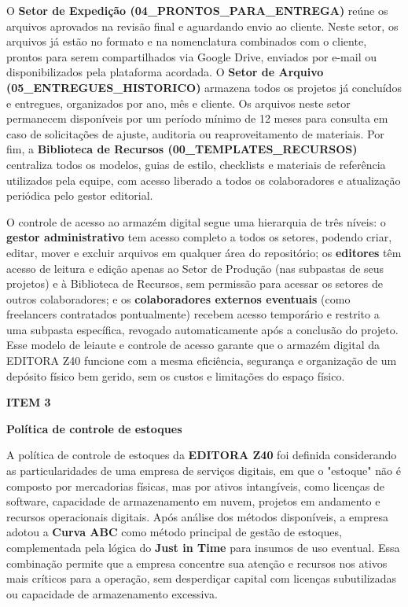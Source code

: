 \documentclass[10pt,a4paper]{article}
\newcommand{\labelfont}{\fontsize{5.8}{7.5}\selectfont\bfseries\addfontfeatures{LetterSpace=15}}
\newcommand{\headingfont}{\fontsize{9.8}{12}\selectfont\bfseries\color{navy}}
\newcommand{\separador}{\vspace{16pt}{\color{rulegray}\rule{\linewidth}{0.6pt}}\vspace{10pt}}
\newcommand{\itemh}[2]{\needspace{6\baselineskip}%
  {\labelfont\color{graylab}ITEM #1}\par\vspace{5pt}%
  {\headingfont #2}\par\vspace{8pt}}
\begin{document}
O \textbf{Setor de Expedição (04\_PRONTOS\_PARA\_ENTREGA)} reúne os arquivos aprovados na revisão final e aguardando envio ao cliente. Neste setor, os arquivos já estão no formato e na nomenclatura combinados com o cliente, prontos para serem compartilhados via Google Drive, enviados por e-mail ou disponibilizados pela plataforma acordada. O \textbf{Setor de Arquivo (05\_ENTREGUES\_HISTORICO)} armazena todos os projetos já concluídos e entregues, organizados por ano, mês e cliente. Os arquivos neste setor permanecem disponíveis por um período mínimo de 12 meses para consulta em caso de solicitações de ajuste, auditoria ou reaproveitamento de materiais. Por fim, a \textbf{Biblioteca de Recursos (00\_TEMPLATES\_RECURSOS)} centraliza todos os modelos, guias de estilo, checklists e materiais de referência utilizados pela equipe, com acesso liberado a todos os colaboradores e atualização periódica pelo gestor editorial.

O controle de acesso ao armazém digital segue uma hierarquia de três níveis: o \textbf{gestor administrativo} tem acesso completo a todos os setores, podendo criar, editar, mover e excluir arquivos em qualquer área do repositório; os \textbf{editores} têm acesso de leitura e edição apenas ao Setor de Produção (nas subpastas de seus projetos) e à Biblioteca de Recursos, sem permissão para acessar os setores de outros colaboradores; e os \textbf{colaboradores externos eventuais} (como freelancers contratados pontualmente) recebem acesso temporário e restrito a uma subpasta específica, revogado automaticamente após a conclusão do projeto. Esse modelo de leiaute e controle de acesso garante que o armazém digital da EDITORA Z40 funcione com a mesma eficiência, segurança e organização de um depósito físico bem gerido, sem os custos e limitações do espaço físico.

\separador
\itemh{3}{Política de controle de estoques}

A política de controle de estoques da \textbf{EDITORA Z40} foi definida considerando as particularidades de uma empresa de serviços digitais, em que o "estoque" não é composto por mercadorias físicas, mas por ativos intangíveis, como licenças de software, capacidade de armazenamento em nuvem, projetos em andamento e recursos operacionais digitais. Após análise dos métodos disponíveis, a empresa adotou a \textbf{Curva ABC} como método principal de gestão de estoques, complementada pela lógica do \textbf{Just in Time} para insumos de uso eventual. Essa combinação permite que a empresa concentre sua atenção e recursos nos ativos mais críticos para a operação, sem desperdiçar capital com licenças subutilizadas ou capacidade de armazenamento excessiva.
\end{document}
